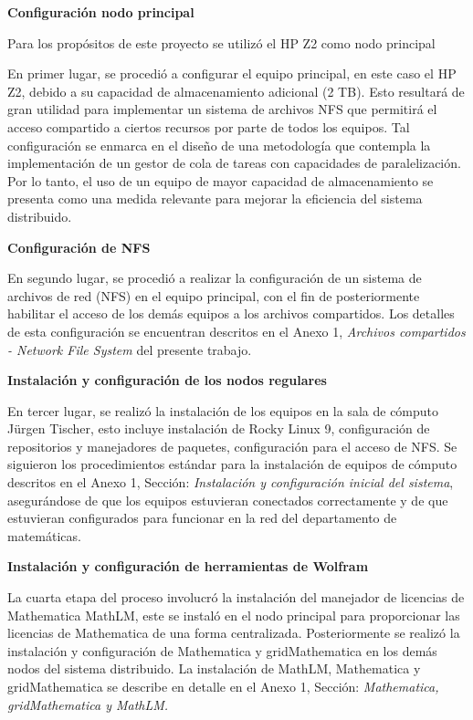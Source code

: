 \begin{spacing}{1.5}
  \textbf{Configuración nodo principal}

  Para los propósitos de este proyecto se utilizó el HP Z2 como nodo principal

En primer lugar, se procedió a configurar el equipo principal, en este caso el HP Z2, debido a su capacidad de almacenamiento adicional (2 TB). Esto resultará de gran utilidad para implementar un sistema de archivos NFS que permitirá el acceso compartido a ciertos recursos por parte de todos los equipos. Tal configuración se enmarca en el diseño de una metodología que contempla la implementación de un gestor de cola de tareas con capacidades de paralelización. Por lo tanto, el uso de un equipo de mayor capacidad de almacenamiento se presenta como una medida relevante para mejorar la eficiencia del sistema distribuido.

\textbf{Configuración de NFS}

En segundo lugar, se procedió a realizar la configuración de un sistema de archivos de red (NFS) en el equipo principal, con el fin de posteriormente  habilitar el acceso de los demás equipos a los archivos compartidos. Los detalles de esta configuración se encuentran descritos en el Anexo 1, \textit{Archivos compartidos - Network File System} del presente trabajo.

\textbf{Instalación y configuración de los nodos regulares}

En tercer lugar, se realizó la instalación de los equipos en la sala de cómputo Jürgen Tischer, esto incluye instalación de Rocky Linux 9, configuración de repositorios y manejadores de paquetes, configuración para el acceso de NFS. Se siguieron los procedimientos estándar para la instalación de equipos de cómputo descritos en el Anexo 1, Sección: \textit{Instalación y configuración inicial del sistema}, asegurándose de que los equipos estuvieran conectados correctamente y de que estuvieran configurados para funcionar en la red del departamento de matemáticas.

\textbf{Instalación y configuración de herramientas de Wolfram}

La cuarta etapa del proceso involucró la instalación del manejador de licencias de Mathematica MathLM, este se instaló en el nodo principal para proporcionar las licencias de Mathematica de una forma centralizada. Posteriormente se realizó la instalación y configuración de Mathematica y gridMathematica en los demás nodos del sistema distribuido. La instalación de MathLM, Mathematica y gridMathematica se describe en detalle en el Anexo 1, Sección: \textit{Mathematica, gridMathematica y MathLM.}


\end{spacing}
